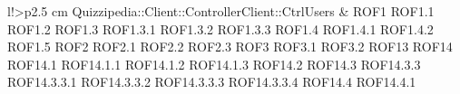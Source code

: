 \begin{tabella}{l!{\VRule}>{\centering\arraybackslash}p{2.5 cm}}
Quizzipedia::Client::ControllerClient::CtrlUsers & ROF1 \linebreak ROF1.1 \linebreak ROF1.2 \linebreak ROF1.3 \linebreak ROF1.3.1 \linebreak ROF1.3.2 \linebreak ROF1.3.3 \linebreak ROF1.4 \linebreak ROF1.4.1 \linebreak ROF1.4.2 \linebreak ROF1.5 \linebreak ROF2 \linebreak ROF2.1 \linebreak ROF2.2 \linebreak ROF2.3 \linebreak ROF3 \linebreak ROF3.1 \linebreak ROF3.2 \linebreak ROF13 \linebreak ROF14 \linebreak ROF14.1 \linebreak ROF14.1.1 \linebreak ROF14.1.2 \linebreak ROF14.1.3 \linebreak ROF14.2 \linebreak ROF14.3 \linebreak ROF14.3.3 \linebreak ROF14.3.3.1 \linebreak ROF14.3.3.2 \linebreak ROF14.3.3.3 \linebreak ROF14.3.3.4 \linebreak ROF14.4 \linebreak ROF14.4.1 \\

\end{tabella}
